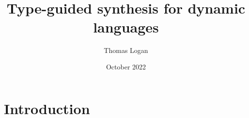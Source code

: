 \documentclass{article}
\title{Type-guided synthesis for dynamic languages}
\author{Thomas Logan}
\date{October 2022}
\begin{document}
\maketitle

\section{Introduction}




\end{document}
